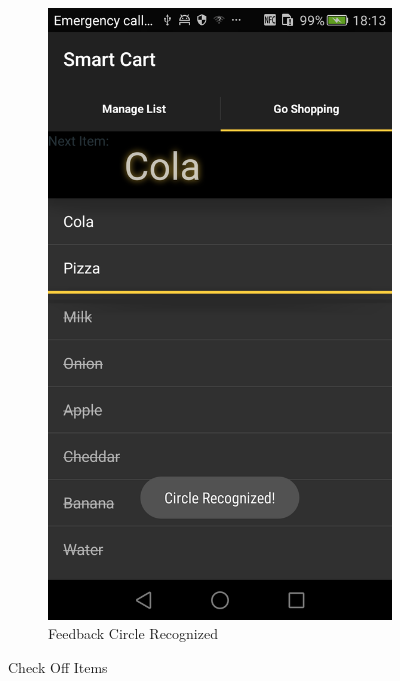 \begin{figure}[h]
\begin{subfigure}{0.475\textwidth}
\centering 
\includegraphics[height= 0.35\textheight]{res/usermanual/circleRecognized.png}
\caption{Feedback Circle Recognized}
\label{fig:initial}
\end{subfigure}
\caption{Check Off Items}
\label{fig:checkItems}
\end{figure}



